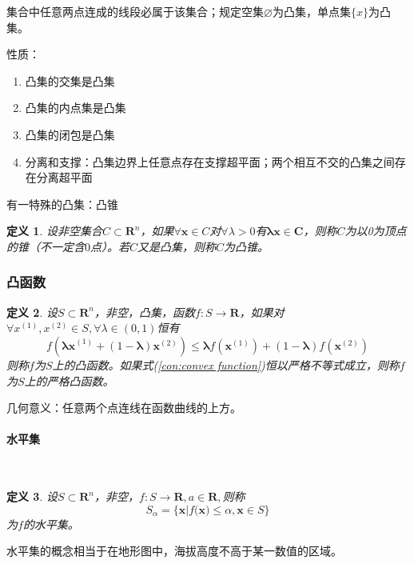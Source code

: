 \documentclass{book}
\newtheorem{definition}{\indent 定义}[chapter]
\newcommand{\subsubsubsection}[1]{\paragraph{#1}\mbox{}\\}
\begin{document}
集合中任意两点连成的线段必属于该集合；规定空集$\varnothing$为凸集，单点集$\{x\}$为凸集。

性质：
\begin{enumerate}
    \item 凸集的交集是凸集
    \item 凸集的内点集是凸集
    \item 凸集的闭包是凸集
    \item 分离和支撑：凸集边界上任意点存在支撑超平面；两个相互不交的凸集之间存在分离超平面
\end{enumerate}

有一特殊的凸集：凸锥

\begin{definition}
    设非空集合$C\subset\mathbf{R}^n$，如果$\forall\boldsymbol{x}\in C$对$\forall\lambda>0$有$\boldsymbol{\lambda x \in C}$，则称$C$为以0为顶点的锥（不一定含$0$点）。若$C$又是凸集，则称$C$为凸锥。
\end{definition}

\subsubsection{凸函数}
\begin{definition}
    设$S\subset \mathbf{R}^n$，非空，凸集，函数$f:S\rightarrow \mathbf{R}$，如果对$\forall x^{(1)}, x^{(2)}\in S, \forall\lambda\in (0,1)$恒有
    \begin{equation}
        f(\boldsymbol{\lambda x}^{(1)}+(1-\boldsymbol{\lambda})\boldsymbol{x}^{(2)})\le\boldsymbol{\lambda}f(\boldsymbol{x}^{(1)})+(1-\boldsymbol{\lambda})f(\boldsymbol{x}^{(2)})
        \label{con:convex function}
    \end{equation}
    则称$f$为$S$上的凸函数。如果式(\ref{con:convex function})恒以严格不等式成立，则称$f$为$S$上的严格凸函数。
\end{definition}

几何意义：任意两个点连线在函数曲线的上方。

\subsubsubsection{水平集}
\begin{definition}
    设$S\subset\mathbf{R}^n$，非空，$f:S\rightarrow\mathbf{R}, a\in \mathbf{R},$则称
    \begin{equation}
        S_{\alpha}=\{\boldsymbol{x}|f(\boldsymbol{x)}\le\alpha,\boldsymbol{x}\in S\}
        \label{con:level set}
    \end{equation}
    为$f$的水平集。
\end{definition}

水平集的概念相当于在地形图中，海拔高度不高于某一数值的区域。
\end{document}
